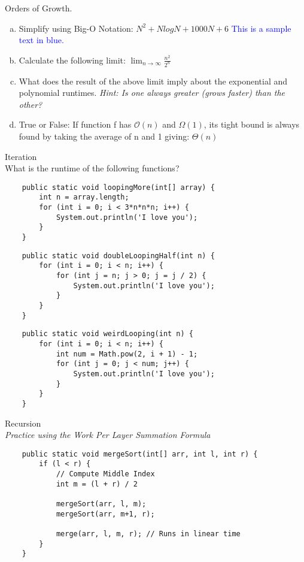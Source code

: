 \documentclass[11pt,letterpaper]{article}
\begin{document}


\problem Orders of Growth. 
\begin{enumerate}[(a)]
    \item Simplify using Big-O Notation: $N^{2} + NlogN + 1000N + 6$
        \pspace
        \textcolor{blue}{This is a sample text in blue.}
        \pspace
    \item Calculate the following limit:
    $\lim_{n \to \infty} \frac{n^{2}}{2^{n}}$
    \pspace
    \pspace
    \pspace
    \pspace
    \pspace
    \item What does the result of the above limit imply about the exponential and polynomial runtimes. 
    \textit{Hint: Is one always greater (grows faster) than the other?}
    \pspace
    \pspace
    \pspace
    \pspace
    \pspace
    \item True or False: If function f has $\mathcal{O}(n)$ and $\Omega(1)$, its tight bound is always found by taking the average of n and 1 giving: $\Theta(n)$
    \pspace
    \pspace
    \pspace
    \pspace
    \pspace
\end{enumerate}
\pspace
\newpage


\problem Iteration
\\ 
What is the runtime of the following functions?
\begin{lstlisting}
    public static void loopingMore(int[] array) {
        int n = array.length;
        for (int i = 0; i < 3*n*n*n; i++) {
            System.out.println('I love you');
        }
    }
\end{lstlisting}
\pspace
\pspace
\pspace
\pspace
\begin{lstlisting}
    public static void doubleLoopingHalf(int n) {
        for (int i = 0; i < n; i++) {
            for (int j = n; j > 0; j = j / 2) {
                System.out.println('I love you');
            }
        }
    }
\end{lstlisting}
\pspace
\pspace
\pspace
\pspace

\begin{lstlisting}
    public static void weirdLooping(int n) {
        for (int i = 0; i < n; i++) {
            int num = Math.pow(2, i + 1) - 1;
            for (int j = 0; j < num; j++) {
                System.out.println('I love you');
            }
        }
    }
\end{lstlisting}
\pspace
\pspace
\pspace
\pspace
\pspace
\newpage


\problem Recursion
\\
\textit{Practice using the Work Per Layer Summation Formula}
\begin{lstlisting}
    public static void mergeSort(int[] arr, int l, int r) {
        if (l < r) {
            // Compute Middle Index
            int m = (l + r) / 2
            
            mergeSort(arr, l, m);
            mergeSort(arr, m+1, r);
            
            merge(arr, l, m, r); // Runs in linear time 
        }
    }
\end{lstlisting}
\pspace
\pspace
\pspace
\pspace
\end{document}
